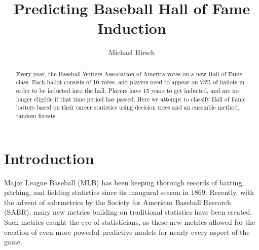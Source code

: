 \documentclass[preprint,12pt]{elsarticle}
\begin{document}
\begin{frontmatter}


\title{Predicting Baseball Hall of Fame Induction}




\author{Michael Hirsch}
\address{ILLC, University of Amsterdam}
\address{michaelahirsch@gmail.com}

\begin{abstract}
Every year, the Baseball Writers Association of America votes on a new Hall of Fame class. Each ballot consists of 10 votes, and players need to appear on 75\% of ballots in order to be inducted into the hall. Players have 15 years to get inducted, and are no longer eligible if that time period has passed. Here we attempt to classify Hall of Fame batters based on their career statistics using decision trees and an ensemble method, random forests.
\end{abstract}


\end{frontmatter}

\section{Introduction}
\label{intro}
Major League Baseball (MLB) has been keeping thorough records of batting, pitching, and fielding statistics since its inaugural season in 1869. Recently, with the advent of sabrmetrics by the Society for American Baseball Research (SABR), many  new metrics building on traditional statistics have been created. Such metrics caught the eye of statisticians, as these new metrics allowed for the creation of even more powerful predictive models for nearly every aspect of the game. 
\end{document}
